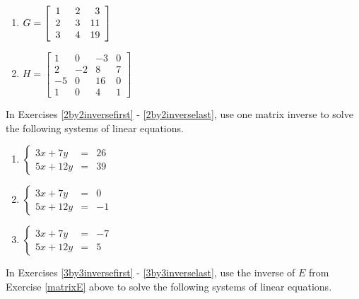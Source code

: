 \begin{multicols}{2}
\begin{enumerate}
\setcounter{enumi}{\value{HW}}

\item $G = \left[ \begin{array}{rrr} 1 & \hphantom{1}2 & 3 \\ 2 & 3 & 11 \\ 3 & 4 & 19 \end{array} \right]$
\item $H = \left[ \begin{array}{rrrr} 1 & 0 & -3 & 0 \\ 2 & -2 & 8 & 7 \\ -5 & 0 & 16 & 0 \\ 1 & 0 & 4 & 1 \end{array} \right]$ \label{findmatinverselast}

\setcounter{HW}{\value{enumi}}
\end{enumerate}
\end{multicols}


In Exercises \ref{2by2inversefirst} - \ref{2by2inverselast}, use one matrix inverse to solve the following systems of linear equations.

\begin{multicols}{3}
\begin{enumerate}
\setcounter{enumi}{\value{HW}}

\item $\left\{ \begin{array}{rcr}   3x + 7y & = & 26 \\ 5x + 12y & = & 39  \end{array} \right.$ \label{2by2inversefirst}
\item $\left\{ \begin{array}{rcr}   3x + 7y & = &  0 \\ 5x + 12y & = & -1  \end{array} \right.$
\item $\left\{ \begin{array}{rcr}   3x + 7y & = & -7 \\ 5x + 12y & = &  5  \end{array} \right.$ \label{2by2inverselast}


\setcounter{HW}{\value{enumi}}
\end{enumerate}
\end{multicols}


In Exercises \ref{3by3inversefirst} - \ref{3by3inverselast}, use the inverse of $E$ from Exercise \ref{matrixE} above to solve the following systems of linear equations.

